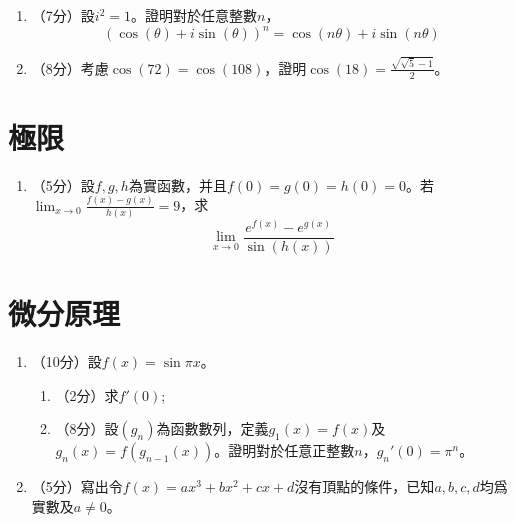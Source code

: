 \documentclass[12pt]{article}
\begin{document}
    \begin{enumerate}
        \item （7分）設$i^2=1$。證明對於任意整數$n$，$$(\cos(\theta)+i\sin(\theta))^n=\cos(n\theta)+i\sin(n\theta)$$
        \item （8分）考慮$\cos(72)=\cos(108)$，證明$\cos(18)=\frac{\sqrt{\sqrt{5}-1}}{2}$。
    \end{enumerate}

    \section*{極限}

    \begin{enumerate}
        \item （5分）設$f,g,h$為實函數，并且$f(0)=g(0)=h(0)=0$。若$\lim_{x\to 0}\frac{f(x)-g(x)}{h(x)}=9$，求$$\lim_{x\to 0}\frac{e^{f(x)}-e^{g(x)}}{\sin(h(x))}$$
    \end{enumerate}

    \section*{微分原理}

    \begin{enumerate}
        \item （10分）設$f(x)=\sin{\pi x}$。\begin{enumerate}
            \item （2分）求$f'(0)$;
            \item （8分）設$(g_n)$為函數數列，定義$g_1(x)=f(x)$及$g_n(x)=f(g_{n-1}(x))$。證明對於任意正整數$n$，$g_n'(0)=\pi^n$。
        \end{enumerate}
        \item （5分）寫出令$f(x)=ax^3+bx^2+cx+d$沒有頂點的條件，已知$a,b,c,d$均爲實數及$a\neq 0$。
    \end{enumerate}
\end{document}

